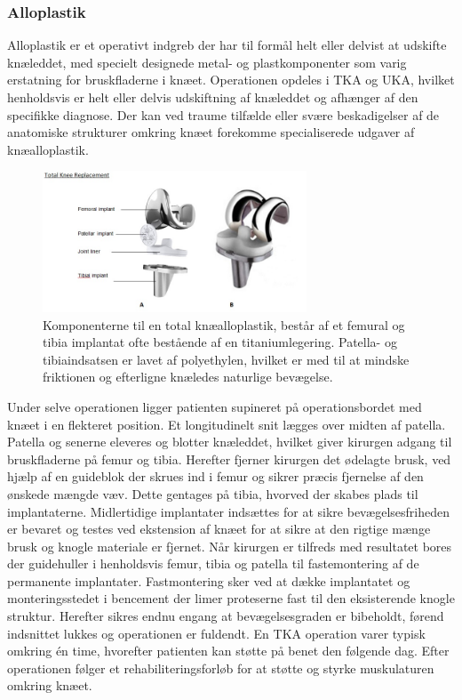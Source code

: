 \subsubsection{Alloplastik}
Alloplastik er et operativt indgreb der har til formål helt eller delvist at udskifte knæleddet, med specielt designede metal- og plastkomponenter som varig erstatning for bruskfladerne i knæet. Operationen opdeles i TKA og UKA, hvilket henholdsvis er helt eller delvis udskiftning af knæleddet og afhænger af den specifikke diagnose. Der kan ved traume tilfælde eller svære beskadigelser af de anatomiske strukturer omkring knæet forekomme specialiserede udgaver af knæalloplastik.

\begin{figure}[H] 
\begin{center}
\includegraphics[width=0.7\textwidth]{figures/tka_implant}
\end{center}
\caption{Komponenterne til en total knæalloplastik, består af et femural og tibia implantat ofte bestående af en titaniumlegering. Patella- og tibiaindsatsen er lavet af polyethylen, hvilket er med til at mindske friktionen og efterligne knæledes naturlige bevægelse.\cite{1}} 
\label{fig:tka_implant} 
\end{figure}

Under selve operationen ligger patienten supineret på operationsbordet med knæet i en flekteret position. Et longitudinelt snit lægges over midten af patella. Patella og senerne eleveres og blotter knæleddet, hvilket giver kirurgen adgang til bruskfladerne på femur og tibia. Herefter fjerner kirurgen det ødelagte brusk, ved hjælp af en guideblok der skrues ind i femur og sikrer præcis fjernelse af den ønskede mængde væv. Dette gentages på tibia, hvorved der skabes plads til implantaterne. Midlertidige implantater indsættes for at sikre bevægelsesfriheden er bevaret og testes ved ekstension af knæet for at sikre at den rigtige mænge brusk og knogle materiale er fjernet. Når kirurgen er tilfreds med resultatet bores der guidehuller i henholdsvis femur, tibia og patella til fastemontering af de permanente implantater. Fastmontering sker ved at dække implantatet og monteringsstedet i bencement der limer proteserne fast til den eksisterende knogle struktur. Herefter sikres endnu engang at bevægelsesgraden er bibeholdt, førend indsnittet lukkes og operationen er fuldendt. En TKA operation varer typisk omkring én time, hvorefter patienten kan støtte på benet den følgende dag. Efter operationen følger et rehabiliteringsforløb for at støtte og styrke muskulaturen omkring knæet. \citep{Sanna2013} \citep{tka-technique}

